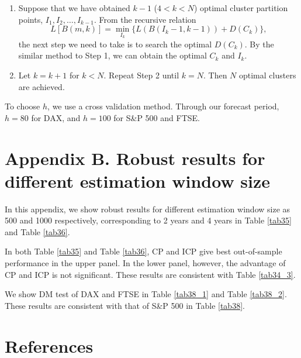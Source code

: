 \documentclass[preprint,12pt,authoryear]{elsarticle}
\begin{document}
\begin{appendix}
\begin{enumerate}[Step 1.]
\item Suppose that we have obtained $k-1$ ($4<k<N$) optimal cluster partition points, $I_1,I_2,\dots,I_{k-1}$. From the recursive relation
$$L[B(m,k)]=\min_{I_k} \{L( B ( I_k-1,k-1 ))+D(C_k)\},$$ the next step we need to take is to search the optimal $D(C_k)$.
By the similar method to Step 1, we can obtain the optimal $C_k$ and $I_k$.
\item Let $k = k+1$ for $k<N$. Repeat Step 2 until $k=N$. Then $N$ optimal clusters are achieved.
\end{enumerate}
To choose $h$, we use a cross validation method. Through our forecast period, $h=80$ for DAX, and $h=100$ for S\&P 500 and FTSE.

\section*{Appendix B. Robust results for different estimation window size}

In this appendix, we show robust results for different estimation window size as 500 and 1000 respectively, corresponding to 2 years and 4 years in Table \ref{tab35} and Table \ref{tab36}.

In both Table \ref{tab35} and Table \ref{tab36}, CP and ICP give best out-of-sample performance in the upper panel. In the lower panel, however, the advantage of CP and ICP is not significant. These results are consistent with Table \ref{tab34_3}.

We show DM test of DAX and FTSE in Table \ref{tab38_1} and Table \ref{tab38_2}. These results are consistent with that of S\&P 500 in Table \ref{tab38}.
\end{appendix}

\newpage
\section*{References}

% 
\end{document}
